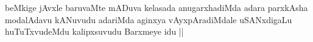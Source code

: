 
\begin{artha}
beMkige jAvxle baruvaMte mADuva kelasada anugarxhadiMda adara
parxkAsha modalAdavu kANuvudu adariMda aginxya vAyxpAradiMdale
uSANxdigaLu huTuTxvudeMdu kalipxsuvudu Barxmeye idu ||
\end{artha}

\begin{artha}

\end{artha}

\begin{artha}

\end{artha}

\begin{artha}

\end{artha}

\begin{artha}

\end{artha}

\begin{artha}

\end{artha}

\begin{artha}

\end{artha}

\begin{artha}

\end{artha}

\begin{artha}

\end{artha}

\begin{artha}

\end{artha}

\begin{artha}

\end{artha}

\begin{artha}

\end{artha}

\begin{artha}

\end{artha}

